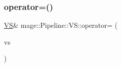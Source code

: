 \hypertarget{structmage_1_1_pipeline_1_1_v_s_a9d941f80b1d1c751927a6c2fda9dfdcb}{}\label{structmage_1_1_pipeline_1_1_v_s_a9d941f80b1d1c751927a6c2fda9dfdcb} 
\subsubsection{\texorpdfstring{operator=()}{operator=()}\hspace{0.1cm}{\footnotesize\ttfamily [2/2]}}
{\footnotesize\ttfamily \hyperlink{structmage_1_1_pipeline_1_1_v_s}{VS}\& mage\+::\+Pipeline\+::\+V\+S\+::operator= (\begin{DoxyParamCaption}\item[{\hyperlink{structmage_1_1_pipeline_1_1_v_s}{VS} \&\&}]{vs }\end{DoxyParamCaption})\hspace{0.3cm}{\ttfamily [delete]}}


